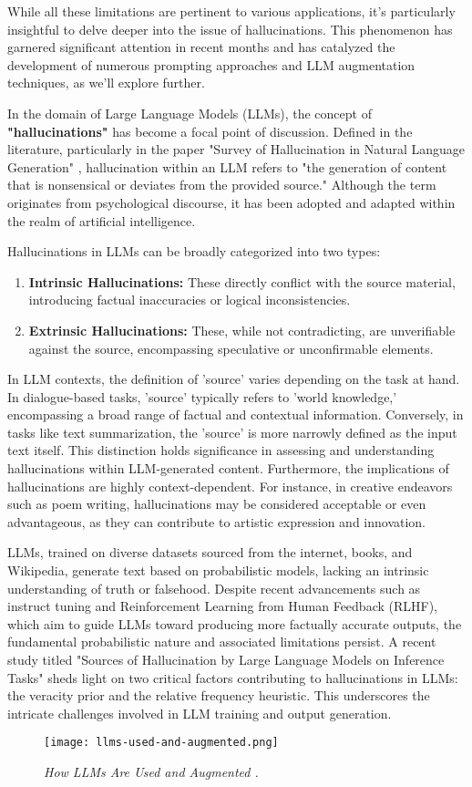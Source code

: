 While all these limitations are pertinent to various applications, it's particularly insightful to delve deeper into the issue of hallucinations. This phenomenon has garnered significant attention in recent months and has catalyzed the development of numerous prompting approaches and LLM augmentation techniques, as we'll explore further.

\hfill

In the domain of Large Language Models (LLMs), the concept of \textbf{"hallucinations"} has become a focal point of discussion. Defined in the literature, particularly in the paper "Survey of Hallucination in Natural Language Generation" \cite{Ji_2023}, hallucination within an LLM refers to "the generation of content that is nonsensical or deviates from the provided source." Although the term originates from psychological discourse, it has been adopted and adapted within the realm of artificial intelligence.

Hallucinations in LLMs can be broadly categorized into
two types:

\begin{enumerate}
    \item \textbf{Intrinsic Hallucinations:} These directly conflict with the source material, introducing factual inaccuracies or logical inconsistencies.
    \item \textbf{Extrinsic Hallucinations:} These, while not contradicting, are unverifiable against the source, encompassing speculative or unconfirmable elements.
\end{enumerate}

In LLM contexts, the definition of 'source' varies depending on the task at hand. In dialogue-based tasks, 'source' typically refers to 'world knowledge,' encompassing a broad range of factual and contextual information. Conversely, in tasks like text summarization, the 'source' is more narrowly defined as the input text itself. This distinction holds significance in assessing and understanding hallucinations within LLM-generated content. Furthermore, the implications of hallucinations are highly context-dependent. For instance, in creative endeavors such as poem writing, hallucinations may be considered acceptable or even advantageous, as they can contribute to artistic expression and innovation.

LLMs, trained on diverse datasets sourced from the internet, books, and Wikipedia, generate text based on probabilistic models, lacking an intrinsic understanding of truth or falsehood. Despite recent advancements such as instruct tuning and Reinforcement Learning from Human Feedback (RLHF), which aim to guide LLMs toward producing more factually accurate outputs, the fundamental probabilistic nature and associated limitations persist. A recent study titled "Sources of Hallucination by Large Language Models on Inference Tasks" \cite{mckenna2023sources} sheds light on two critical factors contributing to hallucinations in LLMs: the veracity prior and the relative frequency heuristic. This underscores the intricate challenges involved in LLM training and output generation.

\begin{figure}[H]
    \centering
    \texttt{[image: llms-used-and-augmented.png]}
    \caption{
        \it{How LLMs Are Used and Augmented \cite{minaee2024large}.}
    }
    \label{fig:llm-used-and-augmented}
\end{figure}